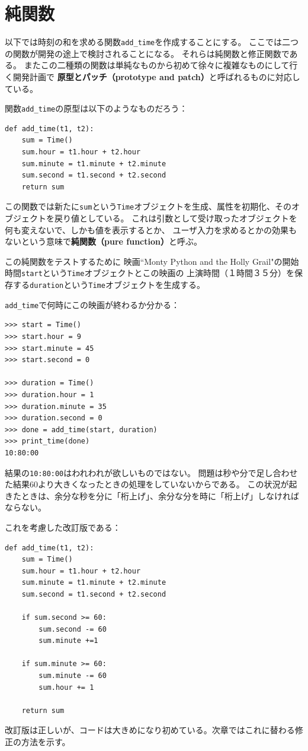 \documentclass[a4j,12pt,makeidx]{jbook}
\begin{document}
\section{純関数}
以下では時刻の和を求める関数{\tt add\_time}を作成することにする。
ここでは二つの関数が開発の途上で検討されることになる。
それらは純関数と修正関数である。
またこの二種類の関数は単純なものから初めて徐々に複雑なものにして行く開発計画で
{\bf 原型とパッチ（prototype and patch）}と呼ばれるものに対応している。\par
関数{\tt add\_time}の原型は以下のようなものだろう：
\begin{verbatim}
def add_time(t1, t2):
    sum = Time()
    sum.hour = t1.hour + t2.hour
    sum.minute = t1.minute + t2.minute
    sum.second = t1.second + t2.second
    return sum
\end{verbatim}
この関数では新たに{\tt sum}という{\tt Time}オブジェクトを生成、属性を初期化、そのオブジェクトを戻り値としている。
これは引数として受け取ったオブジェクトを何も変えないで、しかも値を表示するとか、
ユーザ入力を求めるとかの効果もないという意味で{\bf 純関数（pure function）}と呼ぶ。 \par
この純関数をテストするために
映画``Monty Python and the Holly Grail"の開始時間{\tt start}という{\tt Time}オブジェクトとこの映画の
上演時間（１時間３５分）を保存する{\tt duration}という{\tt Time}オブジェクトを生成する。\par
{\tt add\_time}で何時にこの映画が終わるか分かる：
\begin{verbatim}
>>> start = Time()
>>> start.hour = 9
>>> start.minute = 45
>>> start.second = 0

>>> duration = Time()
>>> duration.hour = 1
>>> duration.minute = 35
>>> duration.second = 0
>>> done = add_time(start, duration)
>>> print_time(done)
10:80:00
\end{verbatim}
結果の{\tt 10:80:00}はわれわれが欲しいものではない。
問題は秒や分で足し合わせた結果60より大きくなったときの処理をしていないからである。
この状況が起きたときは、余分な秒を分に「桁上げ」、余分な分を時に「桁上げ」しなければならない。\par
これを考慮した改訂版である：
\begin{verbatim}
def add_time(t1, t2):
    sum = Time()
    sum.hour = t1.hour + t2.hour
    sum.minute = t1.minute + t2.minute
    sum.second = t1.second + t2.second

    if sum.second >= 60:
        sum.second -= 60
        sum.minute +=1

    if sum.minute >= 60:
        sum.minute -= 60
        sum.hour += 1
        
    return sum
\end{verbatim}
改訂版は正しいが、コードは大きめになり初めている。次章ではこれに替わる修正の方法を示す。
%
\end{document}
